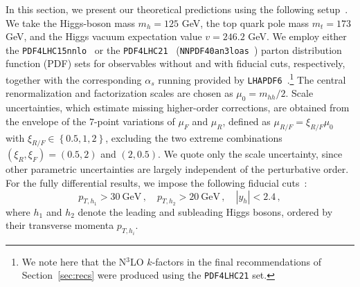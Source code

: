 In this section, we present our theoretical predictions using the following setup~\cite{Chen:2019lzz,Chen:2019fhs,Ajjath:2022kpv,Chen:2026zmi}. We take the Higgs-boson mass $m_h=125$ GeV, the top quark pole mass $m_t=173$ GeV, and the Higgs vacuum expectation value $v=246.2$ GeV. We employ either the \texttt{PDF4LHC15\ttus nnlo}~\cite{Butterworth:2015oua,Dulat:2015mca,Harland-Lang:2014zoa,NNPDF:2014otw} or the \texttt{PDF4LHC21}~\cite{PDF4LHCWorkingGroup:2022cjn}
(\texttt{NNPDF40\ttus an3lo\ttus as}~\cite{NNPDF:2024nan}) parton distribution function (PDF) sets for observables without and with fiducial cuts, respectively, together with the corresponding $\alpha_s$ running provided by {\tt LHAPDF6}~\cite{Buckley:2014ana}.\footnote{We note here that the N$^3$LO $k$-factors in the final recommendations of Section~\ref{sec:recs} were produced using the \texttt{PDF4LHC21} set.}
The central renormalization and factorization scales are chosen as $\mu_0 = m_{hh}/2$. Scale uncertainties, which estimate missing higher-order corrections, are obtained from the envelope of the $7$-point variations of
$\mu_F$ and $\mu_R$, defined as $\mu_{R/F} = \xi_{R/F} \mu_0$ with $\xi_{R/F}\in \left\{0.5,1,2\right\}$, excluding the two extreme combinations $(\xi_R, \xi_F)=(0.5, 2)$ and $(2, 0.5)$. We quote only the scale uncertainty, since other parametric uncertainties are largely independent of the perturbative order.
For the fully differential results, we impose the following fiducial cuts~\cite{Chen:2026zmi}:
\begin{equation}
\label{eq:fiducialcuts}
p_{T, h_{1}}>30~\mathrm{GeV}\,, \quad p_{T, h_{2}}>20~\mathrm{GeV}\,, \quad |y_{h}|<2.4\,,
\end{equation}
where $h_1$ and $h_2$ denote the leading and subleading Higgs bosons, ordered by their transverse momenta $p_{T,h_i}$.







